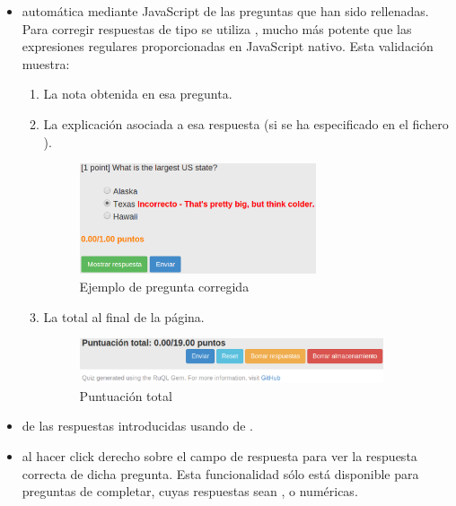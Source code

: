 \begin{itemize}
\begin{itemize}
\begin{itemize}
    \end{itemize}
  \end{itemize}
  
  \item {} autom\'atica mediante JavaScript de las preguntas que han sido rellenadas. Para corregir respuestas de tipo 
  se utiliza , mucho m\'as potente que las expresiones regulares proporcionadas en JavaScript nativo. Esta validaci\'on muestra:
  \begin{enumerate}
    \item La nota obtenida en esa pregunta.
    \item La explicaci\'on asociada a esa respuesta (si se ha especificado en el fichero ).
    \begin{figure}[H]
    \begin{center}
    \includegraphics[width=0.7\textwidth]{images/validation1.eps}
    \caption{Ejemplo de pregunta corregida}
    \label{fig:validation1}
    \end{center}
    \end{figure}
    \newpage
    
    \item La  total al final de la p\'agina.
    \begin{figure}[!th]
    \begin{center}
    \includegraphics[width=0.9\textwidth]{images/validation2.eps}
    \caption{Puntuaci\'on total}
    \label{fig:validation2}
    \end{center}
    \end{figure}
    
  \end{enumerate}
  
  \item {} de las respuestas introducidas usando  de .
  \item {} al hacer click derecho sobre el campo de respuesta para ver la respuesta correcta de dicha pregunta.
  Esta funcionalidad s\'olo est\'a disponible para preguntas de completar, cuyas respuestas sean ,
   o num\'ericas.
  

\end{itemize}

